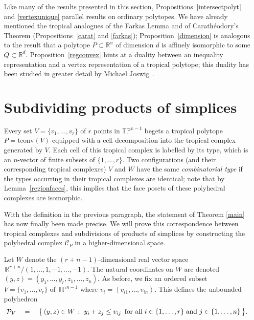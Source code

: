 \documentclass[11pt]{amsart}
\newcommand{\RR}{\mathbb{R}}
\newcommand{\TP}{\mathbb{TP}}
\begin{document}
Like many of the results presented in this section, 
Propositions~\ref{intersectpolyt} and \ref{vertexunique} 
parallel results on ordinary polytopes. 
We have already mentioned the tropical analogues of the Farkas 
Lemma and of Carath\'{e}odory's 
Theorem (Propositions~\ref{carat} and \ref{farkas}); 
Proposition~\ref{dimension} is analogous to the result that a 
polytope $P\subset \RR^n$ of dimension $d$ is 
affinely isomorphic to some $Q\subset \RR^d$. 
Proposition~\ref{regconvex} hints at a duality between an inequality 
representation and a vertex representation of a tropical polytope; this duality has been studied in greater detail 
by Michael Joswig~\cite{Jos}.

\section{Subdividing products of simplices}\label{triang}

Every set $V=\{v_1,\ldots,v_r\}$ of $r$ points in $\TP^{n-1}$ begets a tropical polytope
$P=\text{tconv}(V)$ equipped with a cell decomposition into the tropical complex generated by $V$.  Each
cell of this tropical complex is labelled by its type, which is an $n$-vector of finite subsets of
$\{1,\ldots,r\}$. Two configurations (and their corresponding tropical complexes) $V$ and $W$ have the
same \emph{combinatorial type} if the types occurring in their tropical complexes are identical; note 
that by
Lemma~\ref{regionfaces}, this implies that the face posets of these polyhedral complexes are isomorphic.

With the definition in the previous paragraph, the statement of Theorem \ref{main} has now finally been
made precise.  We will prove this correspondence between tropical complexes and subdivisions of products
of simplices by constructing the polyhedral complex ${\mathcal C}_P$ in a higher-dimensional space.

Let $W$ denote the $(r+n-1)$-dimensional real vector space 
$\, \RR^{r+n}/(1,\ldots,1,-1,\ldots,-1)$.
The natural coordinates on $W$ are denoted
$(y,z) = (y_1,\ldots,y_r, z_1,\ldots,z_n)$.
As before, we fix an ordered subset 
$V = \{v_1,\ldots,v_r\}$ of $\TP^{n-1}$
where $v_i = (v_{i1},\ldots,v_{in})$.
This defines the unbounded polyhedron
\begin{equation}
\label{masterpolyhedron}
{\mathcal P}_V \quad = \quad
\bigl\{\, (y,z) \in W \,:\,\, y_i + z_j \leq v_{ij} \,\,\,
\hbox{for all} \,\,i \in \{1,\ldots,r\}
\,\,\hbox{and}\,\, j \in \{1,\ldots,n\}\, \bigr\}.
\end{equation}
\end{document}
